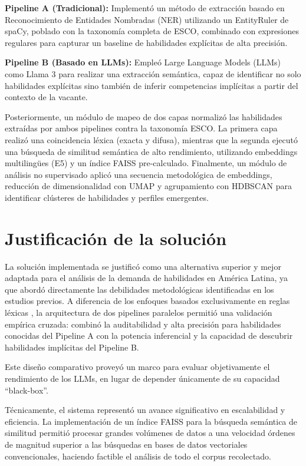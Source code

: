\textbf{Pipeline A (Tradicional):} Implementó un método de extracción basado en Reconocimiento de Entidades Nombradas (NER) utilizando un EntityRuler de spaCy, poblado con la taxonomía completa de ESCO, combinado con expresiones regulares para capturar un baseline de habilidades explícitas de alta precisión.

\textbf{Pipeline B (Basado en LLMs):} Empleó Large Language Models (LLMs) como Llama 3 para realizar una extracción semántica, capaz de identificar no solo habilidades explícitas sino también de inferir competencias implícitas a partir del contexto de la vacante.

Posteriormente, un módulo de mapeo de dos capas normalizó las habilidades extraídas por ambos pipelines contra la taxonomía ESCO. La primera capa realizó una coincidencia léxica (exacta y difusa), mientras que la segunda ejecutó una búsqueda de similitud semántica de alto rendimiento, utilizando embeddings multilingües (E5) y un índice FAISS pre-calculado. Finalmente, un módulo de análisis no supervisado aplicó una secuencia metodológica de embeddings, reducción de dimensionalidad con UMAP y agrupamiento con HDBSCAN para identificar clústeres de habilidades y perfiles emergentes.

\section{Justificación de la solución}

La solución implementada se justificó como una alternativa superior y mejor adaptada para el análisis de la demanda de habilidades en América Latina, ya que abordó directamente las debilidades metodológicas identificadas en los estudios previos. A diferencia de los enfoques basados exclusivamente en reglas léxicas \cite{aguilera2018, rubio2024}, la arquitectura de dos pipelines paralelos permitió una validación empírica cruzada: combinó la auditabilidad y alta precisión para habilidades conocidas del Pipeline A con la potencia inferencial y la capacidad de descubrir habilidades implícitas del Pipeline B.

Este diseño comparativo proveyó un marco para evaluar objetivamente el rendimiento de los LLMs, en lugar de depender únicamente de su capacidad ``black-box''.

Técnicamente, el sistema representó un avance significativo en escalabilidad y eficiencia. La implementación de un índice FAISS para la búsqueda semántica de similitud permitió procesar grandes volúmenes de datos a una velocidad órdenes de magnitud superior a las búsquedas en bases de datos vectoriales convencionales, haciendo factible el análisis de todo el corpus recolectado.

